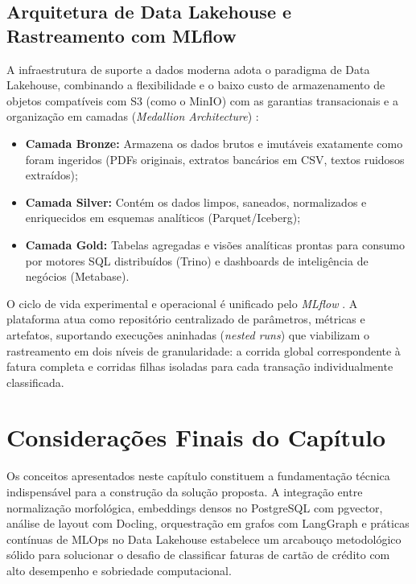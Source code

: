 \documentclass[
	12pt,				
	openright,			
	oneside,			
	a4paper,			
	english,			
	brazil				
	]{abntex2}
\begin{document}
\subsection{Arquitetura de Data Lakehouse e Rastreamento com MLflow}
A infraestrutura de suporte a dados moderna adota o paradigma de Data Lakehouse, combinando a flexibilidade e o baixo custo de armazenamento de objetos compatíveis com S3 (como o MinIO) com as garantias transacionais e a organização em camadas (\textit{Medallion Architecture}) \cite{treveil2020mlops}:
\begin{itemize}
    \item \textbf{Camada Bronze:} Armazena os dados brutos e imutáveis exatamente como foram ingeridos (PDFs originais, extratos bancários em CSV, textos ruidosos extraídos);
    \item \textbf{Camada Silver:} Contém os dados limpos, saneados, normalizados e enriquecidos em esquemas analíticos (Parquet/Iceberg);
    \item \textbf{Camada Gold:} Tabelas agregadas e visões analíticas prontas para consumo por motores SQL distribuídos (Trino) e dashboards de inteligência de negócios (Metabase).
\end{itemize}

O ciclo de vida experimental e operacional é unificado pelo \textit{MLflow} \cite{treveil2020mlops}. A plataforma atua como repositório centralizado de parâmetros, métricas e artefatos, suportando execuções aninhadas (\textit{nested runs}) que viabilizam o rastreamento em dois níveis de granularidade: a corrida global correspondente à fatura completa e corridas filhas isoladas para cada transação individualmente classificada.

\section{Considerações Finais do Capítulo}
\label{sec:fund_consideracoes_finais}

Os conceitos apresentados neste capítulo constituem a fundamentação técnica indispensável para a construção da solução proposta. A integração entre normalização morfológica, embeddings densos no PostgreSQL com pgvector, análise de layout com Docling, orquestração em grafos com LangGraph e práticas contínuas de MLOps no Data Lakehouse estabelece um arcabouço metodológico sólido para solucionar o desafio de classificar faturas de cartão de crédito com alto desempenho e sobriedade computacional.

\end{document}

